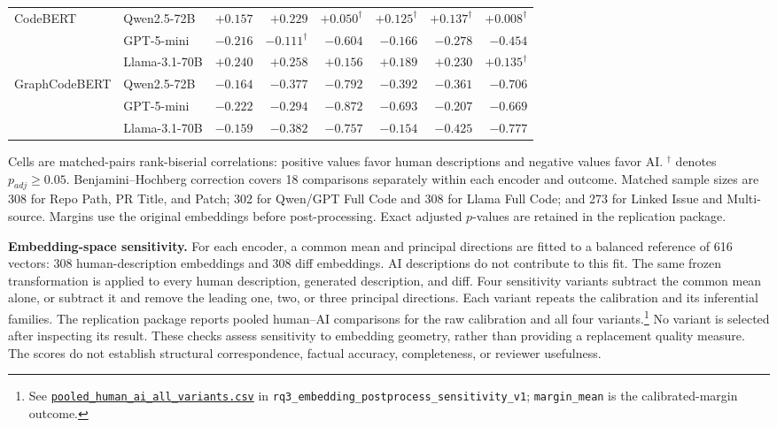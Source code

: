 \documentclass[11pt,a4paper]{article}
\begin{document}
\begin{table}[htbp]
\begin{tabular}{@{}llrrrrrr@{}}
\midrule
CodeBERT & Qwen2.5-72B & $+0.157$ & $+0.229$ & $+0.050^{\dagger}$ & $+0.125^{\dagger}$ & $+0.137^{\dagger}$ & $+0.008^{\dagger}$ \\
 & GPT-5-mini & $-0.216$ & $-0.111^{\dagger}$ & $-0.604$ & $-0.166$ & $-0.278$ & $-0.454$ \\
 & Llama-3.1-70B & $+0.240$ & $+0.258$ & $+0.156$ & $+0.189$ & $+0.230$ & $+0.135^{\dagger}$ \\
\addlinespace[3pt]
GraphCodeBERT & Qwen2.5-72B & $-0.164$ & $-0.377$ & $-0.792$ & $-0.392$ & $-0.361$ & $-0.706$ \\
 & GPT-5-mini & $-0.222$ & $-0.294$ & $-0.872$ & $-0.693$ & $-0.207$ & $-0.669$ \\
 & Llama-3.1-70B & $-0.159$ & $-0.382$ & $-0.757$ & $-0.154$ & $-0.425$ & $-0.777$ \\
\bottomrule
\end{tabular}
\par\smallskip
\begin{minipage}{\textwidth}
\footnotesize
Cells are matched-pairs rank-biserial correlations: positive values favor human descriptions and negative values favor AI. $^{\dagger}$ denotes $p_{adj}\geq0.05$. Benjamini--Hochberg correction covers 18 comparisons separately within each encoder and outcome. Matched sample sizes are 308 for Repo Path, PR Title, and Patch; 302 for Qwen/GPT Full Code and 308 for Llama Full Code; and 273 for Linked Issue and Multi-source. Margins use the original embeddings before post-processing. Exact adjusted $p$-values are retained in the replication package.
\end{minipage}
\end{table}

\FloatBarrier

\textbf{Embedding-space sensitivity.}
For each encoder, a common mean and principal directions are fitted to a balanced reference of 616 vectors: 308 human-description embeddings and 308 diff embeddings. AI descriptions do not contribute to this fit. The same frozen transformation is applied to every human description, generated description, and diff. Four sensitivity variants subtract the common mean alone, or subtract it and remove the leading one, two, or three principal directions. Each variant repeats the calibration and its inferential families. The replication package reports pooled human--AI comparisons for the raw calibration and all four variants.\footnote{See
\href{https://github.com/NAIST-SE/generated-ai-pull-requests-replication/blob/emse-review-2026-11-02/phase3/analysis/outputs/rq3_embedding_postprocess_sensitivity_v1/summaries/pooled_human_ai_all_variants.csv}{\nolinkurl{pooled_human_ai_all_variants.csv}}
in \nolinkurl{rq3_embedding_postprocess_sensitivity_v1};
\texttt{margin\_mean} is the calibrated-margin outcome.}
No variant is selected after inspecting its result. These checks assess sensitivity to embedding geometry, rather than providing a replacement quality measure. The scores do not establish structural correspondence, factual accuracy, completeness, or reviewer usefulness.
\end{document}
